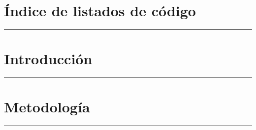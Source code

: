\documentclass[a4paper,11pt]{article}
\begin{document}
\newpage
\thispagestyle{main}
\mbox{}
\newpage

\thispagestyle{main}
\renewcommand{\listfigurename}{Índice de figuras}
\renewcommand{\cftafterloftitle}{%
  \par\nobreak
  {\color{tfgazul}\rule{\textwidth}{3pt}}%
  \par\nobreak
}
\listoffigures
\thispagestyle{main}

\newpage
\thispagestyle{main}
\mbox{}
\newpage

\thispagestyle{main}
\renewcommand{\listtablename}{Índice de tablas}
\renewcommand{\cftafterlottitle}{%
  \par\nobreak
  {\color{tfgazul}\rule{\textwidth}{3pt}}%
  \par\nobreak
}
\listoftables
\thispagestyle{main}

\newpage
\thispagestyle{main}
\mbox{}
\newpage

\thispagestyle{main}
\renewcommand{\lstlistlistingname}{Índice de listados de código}
\section*{\lstlistlistingname}
{\color{tfgazul}\rule{\textwidth}{3pt}}

\begingroup
\renewcommand{\lstlistlistingname}{}
\lstlistoflistings
\endgroup
\thispagestyle{main}

\newpage
\thispagestyle{main}
\mbox{}
\newpage

\section{Introducción}
{\color{tfgazul}\rule{\textwidth}{3pt}}


\newpage
\section{Metodología}
{\color{tfgazul}\rule{\textwidth}{3pt}}

\end{document}
